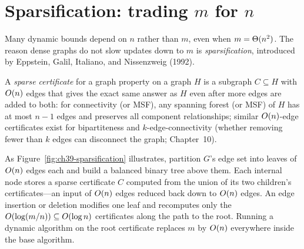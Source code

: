 \section{Sparsification: trading \texorpdfstring{$m$}{m} for \texorpdfstring{$n$}{n}}
\label{ch39:sparsification}

Many dynamic bounds depend on $n$ rather than $m$, even when $m=\Theta(n^2)$. The reason
dense graphs do not slow updates down to $m$ is \emph{sparsification}, introduced by
Eppstein, Galil, Italiano, and Nissenzweig (1992).

\begin{intuitionbox}
A \emph{sparse certificate} for a graph property on a graph $H$ is a subgraph
$C \subseteq H$ with $O(n)$ edges that gives the exact same answer as $H$ even after
more edges are added to both: for connectivity (or MSF), any spanning forest (or MSF)
of $H$ has at most $n-1$ edges and preserves all component relationships; similar
$O(n)$-edge certificates exist for bipartiteness and $k$-edge-connectivity (whether
removing fewer than $k$ edges can disconnect the graph; Chapter~10).

As Figure~\ref{fig:ch39-sparsification} illustrates, partition $G$'s edge set into
leaves of $O(n)$ edges each and build a balanced binary tree above them. Each internal
node stores a sparse certificate $C$ computed from the union of its two children's
certificates---an input of $O(n)$ edges reduced back down to $O(n)$ edges. An edge
insertion or deletion modifies one leaf and recomputes only the $O(\log(m/n)) \subseteq O(\log n)$
certificates along the path to the root. Running a dynamic algorithm on the root
certificate replaces $m$ by $O(n)$ everywhere inside the base algorithm.
\end{intuitionbox}

